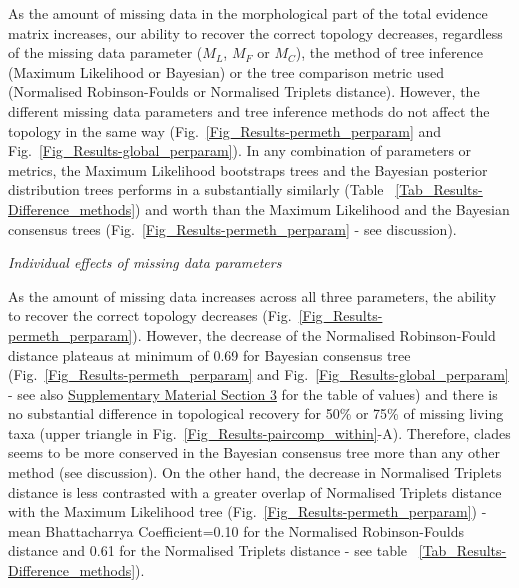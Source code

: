 \documentclass[12pt,letterpaper]{article}
\renewcommand{\subsection}[1]{%
\bigskip
\begin{center}
\begin{large}
\normalfont\itshape #1
\end{large}
\end{center}}
\begin{document}

As the amount of missing data in the morphological part of the total evidence matrix increases, our ability to recover the correct topology decreases, regardless of the missing data parameter ($M_{L}$, $M_{F}$ or $M_{C}$), the method of tree inference (Maximum Likelihood or Bayesian) or the tree comparison metric used (Normalised Robinson-Foulds or Normalised Triplets distance). However, the different missing data parameters and tree inference methods do not affect the topology in the same way (Fig.~\ref{Fig_Results-permeth_perparam} and Fig.~\ref{Fig_Results-global_perparam}). In any combination of parameters or metrics, the Maximum Likelihood bootstraps trees and the Bayesian posterior distribution trees performs in a substantially similarly (Table ~\ref{Tab_Results-Difference_methods}) and worth than the Maximum Likelihood and the Bayesian consensus trees (Fig.~\ref{Fig_Results-permeth_perparam} - see discussion). %

\subsection{Individual effects of missing data parameters} 
As the amount of missing data increases across all three parameters, the ability to recover the correct topology decreases (Fig.~\ref{Fig_Results-permeth_perparam}). However, the decrease of the Normalised Robinson-Fould distance plateaus at minimum of 0.69 for Bayesian consensus tree (Fig.~\ref{Fig_Results-permeth_perparam} and Fig.~\ref{Fig_Results-global_perparam} - see also \hyperref[SupplementaryMaterial]{Supplementary Material Section 3} for the table of values) and there is no substantial difference in topological recovery for 50\% or 75\% of missing living taxa (upper triangle in Fig.~\ref{Fig_Results-paircomp_within}-A). Therefore, clades seems to be more conserved in the Bayesian consensus tree more than any other method (see discussion).  %
On the other hand, the decrease in Normalised Triplets distance is less contrasted with a greater overlap of Normalised Triplets distance with the Maximum Likelihood tree (Fig.~\ref{Fig_Results-permeth_perparam}) - mean Bhattacharrya Coefficient=0.10 for the Normalised Robinson-Foulds distance and 0.61 for the Normalised Triplets distance - see table ~\ref{Tab_Results-Difference_methods}).
\end{document}
